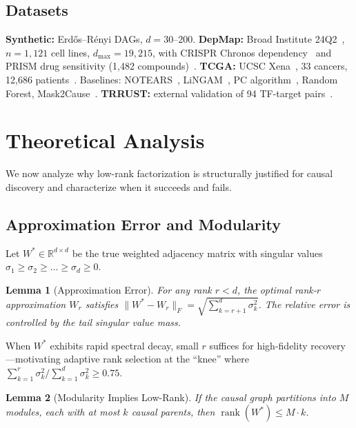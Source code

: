 \documentclass{article}
\newtheorem{lemma}{Lemma}
\theoremstyle{definition}
\begin{document}
\subsection{Datasets}

\textbf{Synthetic:} Erd\H{o}s--R\'{e}nyi DAGs, $d=30$--$200$. \textbf{DepMap:} Broad Institute 24Q2~\citep{tsherniak2017defining}, $n=1{,}121$ cell lines, $d_{\text{max}}=19{,}215$, with CRISPR Chronos dependency~\citep{dempster2019extracting} and PRISM drug sensitivity (1,482 compounds)~\citep{corsello2020discovering}. \textbf{TCGA:} UCSC Xena~\citep{goldman2020ucsc}, 33 cancers, 12,686 patients~\citep{weinstein2013tcga}. Baselines: NOTEARS~\citep{zheng2018dags}, LiNGAM~\citep{shimizu2006lingam}, PC algorithm~\citep{spirtes2000causation,zhang2008causal}, Random Forest, Mask2Cause~\citep{gonzalez2025mask2cause}. \textbf{TRRUST:} external validation of 94 TF-target pairs~\citep{han2018trrust}.

\section{Theoretical Analysis}

We now analyze why low-rank factorization is structurally justified for causal discovery and characterize when it succeeds and fails.

\subsection{Approximation Error and Modularity}

Let $W^* \in \mathbb{R}^{d \times d}$ be the true weighted adjacency matrix with singular values $\sigma_1 \ge \sigma_2 \ge \dots \ge \sigma_d \ge 0$.

\begin{lemma}[Approximation Error]\label{lem:approx}
For any rank $r < d$, the optimal rank-$r$ approximation $W_r$ satisfies $\|W^* - W_r\|_F = \sqrt{\sum_{k=r+1}^d \sigma_k^2}$. The relative error is controlled by the tail singular value mass.
\end{lemma}

When $W^*$ exhibits rapid spectral decay, small $r$ suffices for high-fidelity recovery---motivating adaptive rank selection at the ``knee'' where $\sum_{k=1}^r \sigma_k^2 / \sum_{k=1}^d \sigma_k^2 \ge 0.75$.

\begin{lemma}[Modularity Implies Low-Rank]\label{lem:modular}
If the causal graph partitions into $M$ modules, each with at most $k$ causal parents, then $\operatorname{rank}(W^*) \le M \cdot k$.
\end{lemma}
\end{document}
